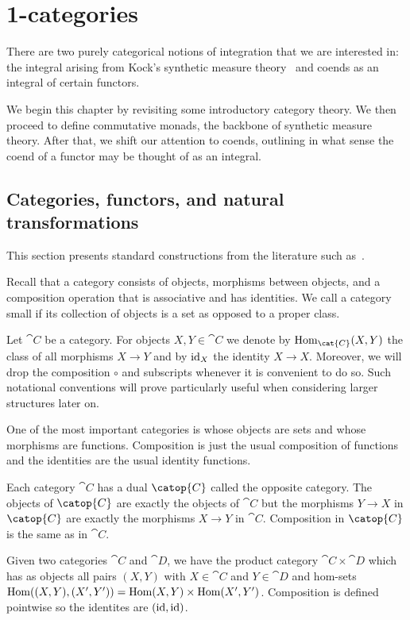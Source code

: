 \chapter{1-categories}\label{sec:synthetic_measure_theory_and_presheaves}

There are two purely categorical notions of integration that we are interested
in: the integral arising from Kock's synthetic measure theory~\cite{kock2011}
and coends as an integral of certain functors.

We begin this chapter by revisiting some introductory category theory. We then
proceed to define commutative monads, the backbone of synthetic measure theory.
After that, we shift our attention to coends, outlining in what sense the coend
of a functor may be thought of as an integral.

\section{Categories, functors, and natural transformations}\label{sec:categories}

This section presents standard constructions from the literature such as~\cite{maclane1997}.

Recall that a category consists of objects, morphisms between objects, and a
composition operation that is associative and has identities. We call a
category small if its collection of objects is a set as opposed to a proper
class.

Let $\cat{C}$ be a category. For objects $X,Y\in\cat{C}$ we denote by
$\Hom_{\cat{C}}(X,Y)$ the class of all morphisms $X\to Y$ and by $\operatorname{id}_X$ the
identity $X\to X$. Moreover, we will drop the composition $\circ$ and
subscripts whenever it is convenient to do so. Such notational conventions will
prove particularly useful when considering larger structures later on.

One of the most important categories is \Set{} whose objects are sets and whose
morphisms are functions. Composition is just the usual composition of functions
and the identities are the usual identity functions.

Each category $\cat{C}$ has a dual $\catop{C}$ called the opposite category.
The objects of $\catop{C}$ are exactly the objects of $\cat{C}$ but the
morphisms $Y\to X$ in $\catop{C}$ are exactly the morphisms $X\to Y$ in $\cat{C}$.
Composition in $\catop{C}$ is the same as in $\cat{C}$.

Given two categories $\cat{C}$ and $\cat{D}$, we have the product category
$\cat{C}\times\cat{D}$ which has as objects all pairs $(X,Y)$ with $X\in\cat{C}$
and $Y\in\cat{D}$ and hom-sets $\operatorname{Hom}((X,Y),(X',Y'))=\operatorname{Hom}(X,Y)\times\operatorname{Hom}(X',Y')$.
Composition is defined pointwise so the identites are $(\operatorname{id},\operatorname{id})$.

